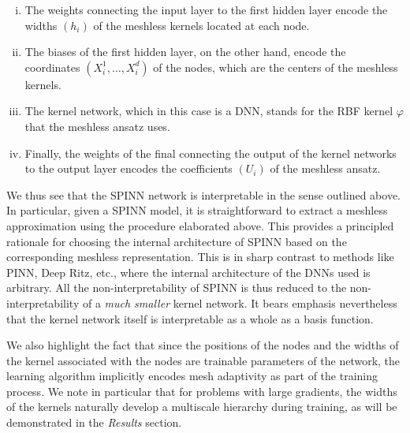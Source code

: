 \documentclass[12pt]{article}
\newcommand{\rR}[1]{#1}
\begin{document}
\begin{enumerate}[(i)]
\item The weights connecting the input layer to the first hidden layer encode the widths $(h_i)$ of the meshless kernels located at each node.
\item The biases of the first hidden layer, on the other hand, encode the coordinates $(X_i^1, \ldots, X_i^d)$ of the nodes, which are the centers of the meshless kernels.
\item The kernel network, which in this case is a DNN, stands for the RBF kernel $\varphi$ that the meshless ansatz uses.
\item Finally, the weights of the final connecting the output of the kernel networks to the output layer encodes the coefficients $(U_i)$ of the meshless ansatz.
\end{enumerate}

We thus see that the SPINN network is  interpretable \rR{in the sense outlined above}. In particular, given a SPINN model, it is straightforward to extract a meshless approximation using the procedure elaborated above. This provides a principled rationale for choosing the internal architecture of SPINN based on the corresponding meshless representation. This is in sharp contrast to methods like PINN, Deep Ritz, etc., where the internal architecture of the DNNs used is arbitrary. \rR{All the non-interpretability of SPINN is thus reduced to the non-interpretability of a \emph{much smaller} kernel network. It bears emphasis nevertheless that the kernel network itself is interpretable as a whole as a basis function.}

We also highlight the fact that since the positions of the nodes and the widths of the kernel associated with the nodes are trainable parameters of the network, the learning algorithm implicitly encodes mesh adaptivity as part of the training process. We note in particular that for problems with large gradients, the widths of the kernels naturally develop a multiscale hierarchy during training, as will be demonstrated in the \emph{Results} section.
\end{document}
